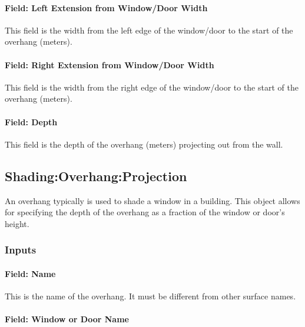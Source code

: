 \paragraph{Field: Left Extension from Window/Door Width}\label{field-left-extension-from-windowdoor-width}

This field is the width from the left edge of the window/door to the start of the overhang (meters).

\paragraph{Field: Right Extension from Window/Door Width}\label{field-right-extension-from-windowdoor-width}

This field is the width from the right edge of the window/door to the start of the overhang (meters).

\paragraph{Field: Depth}\label{field-depth}

This field is the depth of the overhang (meters) projecting out from the wall.

\subsection{Shading:Overhang:Projection}\label{shadingoverhangprojection}

An overhang typically is used to shade a window in a building. This object allows for specifying the depth of the overhang as a fraction of the window or door's height.

\subsubsection{Inputs}\label{inputs-27-003}

\paragraph{Field: Name}\label{field-name-25-003}

This is the name of the overhang. It must be different from other surface names.

\paragraph{Field: Window or Door Name}\label{field-window-or-door-name-1}

